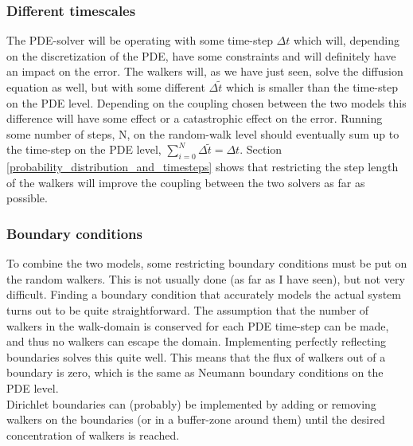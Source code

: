 \subsubsection{Different timescales}
  The PDE-solver will be operating with some time-step $\Delta t$ which will, depending on the discretization of the PDE, have some constraints and will definitely have an impact on the error. 
  The walkers will, as we have just seen, solve the diffusion equation as well, but with some different $\Delta \tilde{t}$ which is smaller than the time-step on the PDE level. 
  Depending on the coupling chosen between the two models this difference will have some effect or a catastrophic effect on the error. 
  Running some number of steps, N, on the random-walk level should eventually sum up to the time-step on the PDE level, $\sum\limits_{i=0}^N \Delta\tilde{t} = \Delta t$. 
  Section \ref{probability_distribution_and_timesteps} shows that restricting the step length of the walkers will improve the coupling between the two solvers as far as possible.

\subsubsection{Boundary conditions}
 To combine the two models, some restricting boundary conditions must be put on the random walkers. 
 This is not usually done (as far as I have seen), but not very difficult. 
 Finding a boundary condition that accurately models the actual system turns out to be quite straightforward.
 The assumption that the number of walkers in the walk-domain is conserved for each PDE time-step can be made, and thus no walkers can escape the domain. 
 Implementing perfectly reflecting boundaries solves this quite well. 
 This means that the flux of walkers out of a boundary is zero, which is the same as Neumann boundary conditions on the PDE level. \\
 Dirichlet boundaries can (probably) be implemented by adding or removing walkers on the boundaries (or in a buffer-zone around them) until the desired concentration of walkers is reached.
 
